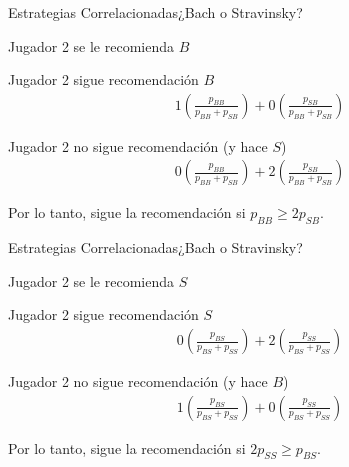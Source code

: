 \documentclass[notes, 11pt]{beamer} %
\newenvironment{wideitemize}{\itemize\addtolength{\itemsep}{10pt}}{\enditemize}
\begin{document}
\begin{frame}{Estrategias Correlacionadas}{¿Bach o Stravinsky?}
\begin{wideitemize}
	\item<1-> Jugador 2 se le recomienda $B$
	\begin{wideitemize}
		\item<2->[--] Jugador 2 sigue recomendaci\'on $B$
		\begin{align*}
			1\left(\frac{p_{BB}}{p_{BB}+p_{SB}}\right) + 0\left(\frac{p_{SB}}{p_{BB}+p_{SB}}\right)
		\end{align*}
		\item<3->[--] Jugador 2 no sigue recomendaci\'on (y hace $S$)
		\begin{align*}
			0\left(\frac{p_{BB}}{p_{BB}+p_{SB}}\right) + 2\left(\frac{p_{SB}}{p_{BB}+p_{SB}}\right)
		\end{align*}
	\end{wideitemize} 
	\item<4-> Por lo tanto, sigue la recomendaci\'on si $p_{BB}\geq 2p_{SB}$.
\end{wideitemize}
\end{frame}

\begin{frame}{Estrategias Correlacionadas}{¿Bach o Stravinsky?}
\begin{wideitemize}
	\item<1-> Jugador 2 se le recomienda $S$
	\begin{wideitemize}
		\item<2->[--] Jugador 2 sigue recomendaci\'on $S$
		\begin{align*}
			0\left(\frac{p_{BS}}{p_{BS}+p_{SS}}\right) + 2\left(\frac{p_{SS}}{p_{BS}+p_{SS}}\right)
		\end{align*}
		\item<3->[--] Jugador 2 no sigue recomendaci\'on (y hace $B$)
		\begin{align*}
			1\left(\frac{p_{BS}}{p_{BS}+p_{SS}}\right) + 0\left(\frac{p_{SS}}{p_{BS}+p_{SS}}\right)
		\end{align*}
	\end{wideitemize} 
	\item<4-> Por lo tanto, sigue la recomendaci\'on si $2p_{SS}\geq p_{BS}$.
\end{wideitemize}
\end{frame}
\end{document}
